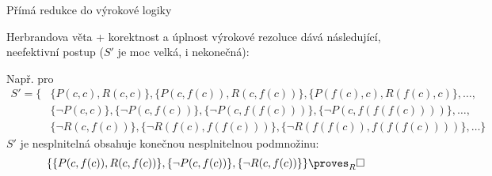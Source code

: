 \documentclass{beamer}
\begin{document}
\begin{frame}{Přímá redukce do výrokové logiky}

    \pause
    Herbrandova věta + korektnost a úplnost výrokové rezoluce dává následující, neefektivní postup ($S'$ je moc velká, i nekonečná):
    
    \medskip

    
    \medskip

    \pause 
    Např. pro 
    {\footnotesize
    \pause 
    \begin{align*}
        S'=\{&\{P(c,c),R(c,c)\},\{P(c,f(c)),R(c,f(c))\},\{P(f(c),c),R(f(c),c)\},\dots,\\ 
        &\{\neg P(c,c)\}, \{\neg P(c,f(c))\},\{\neg P(c,f(f(c)))\},\{\neg P(c,f(f(f(c))))\}, \dots,\\
        &\{\neg R(c,f(c))\}, \{\neg R(f(c),f(f(c)))\},\{\neg R(f(f(c)),f(f(f(c))))\},\dots\}    
    \end{align*}
    }
    \pause 
    $S'$ je nesplnitelná obsahuje konečnou nesplnitelnou podmnožinu:
    $$
    \{\{P(c,f(c)),R(c,f(c))\},\{\neg P(c,f(c))\},\{\neg R(c,f(c))\}\}\proves_R\square
    $$

    \pause 

\end{frame}
\end{document}
